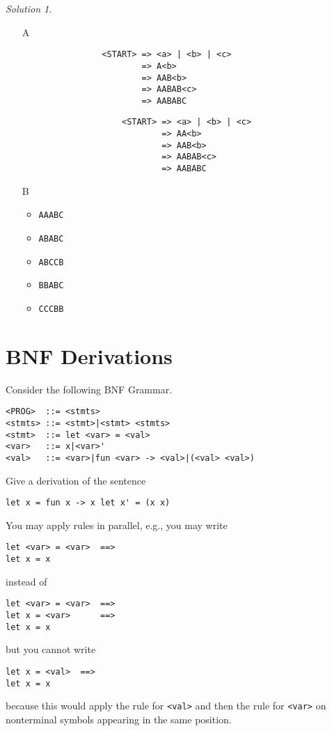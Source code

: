 \documentclass{article}
\theoremstyle{remark} \newtheorem*{solution}{Solution}
\begin{document}
\begin{solution}
\indent
    \begin{itemize}
        \item[A] \indent
            \begin{lstlisting}
                <START> => <a> | <b> | <c>
                        => A<b>
                        => AAB<b>
                        => AABAB<c>
                        => AABABC
            \end{lstlisting}

                \begin{lstlisting}
                    <START> => <a> | <b> | <c>
                            => AA<b>
                            => AAB<b>
                            => AABAB<c>
                            => AABABC
                \end{lstlisting}
        \item[B] 
            \begin{itemize}
              \item \texttt{AAABC}
              \item \texttt{ABABC}
              \item \texttt{ABCCB}
              \item \texttt{BBABC}
              \item \texttt{CCCBB}

           \end{itemize}
            
    \end{itemize}
\end{solution}

\pagebreak
\section{BNF Derivations}

Consider the following BNF Grammar.
\begin{lstlisting}
<PROG>  ::= <stmts>
<stmts> ::= <stmt>|<stmt> <stmts>
<stmt>  ::= let <var> = <val>
<var>   ::= x|<var>'
<val>   ::= <var>|fun <var> -> <val>|(<val> <val>)
\end{lstlisting}
Give a derivation of the sentence
\begin{lstlisting}
let x = fun x -> x let x' = (x x)
\end{lstlisting}
You may apply rules in parallel, e.g., you may write
\begin{lstlisting}
let <var> = <var>  ==>
let x = x
\end{lstlisting}
instead of
\begin{lstlisting}
let <var> = <var>  ==>
let x = <var>      ==>
let x = x
\end{lstlisting}
but you cannot write
\begin{lstlisting}
let x = <val>  ==>
let x = x
\end{lstlisting}
because this would apply the rule for \texttt{<val>} and then the rule
for \texttt{<var>} on nonterminal symbols appearing in the same
position.
\end{document}
